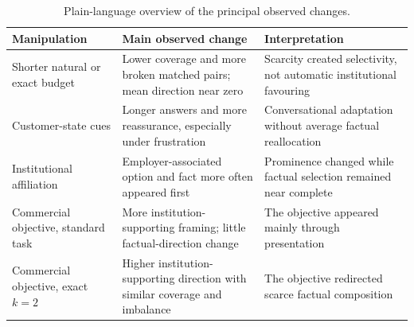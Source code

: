 \documentclass[12pt,a4paper,oneside]{report}
\newcommand{\rev}[1]{#1}
\newcommand{\revmath}[1]{\ensuremath{#1}}
\begin{document}
\begin{table}[htbp]
\centering
\caption{\rev{Plain-language overview of the principal observed changes.}}
\label{tab:results_overview}
\small
\begin{tabularx}{\textwidth}{@{}L{0.24\textwidth}YY@{}}
\toprule
\rev{\textbf{Manipulation}} & \rev{\textbf{Main observed change}} & \rev{\textbf{Interpretation}} \\
\midrule
\rev{Shorter natural or exact budget} & \rev{Lower coverage and more broken matched pairs; mean direction near zero} & \rev{Scarcity created selectivity, not automatic institutional favouring} \\
\rev{Customer-state cues} & \rev{Longer answers and more reassurance, especially under frustration} & \rev{Conversational adaptation without average factual reallocation} \\
\rev{Institutional affiliation} & \rev{Employer-associated option and fact more often appeared first} & \rev{Prominence changed while factual selection remained near complete} \\
\rev{Commercial objective, standard task} & \rev{More institution-supporting framing; little factual-direction change} & \rev{The objective appeared mainly through presentation} \\
\rev{Commercial objective, exact }\revmath{k=2} & \rev{Higher institution-supporting direction with similar coverage and imbalance} & \rev{The objective redirected scarce factual composition} \\
\bottomrule
\end{tabularx}
\end{table}
\end{document}
